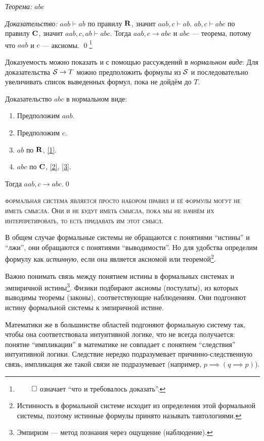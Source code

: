 {\it Теорема:} $abc$

{\it Доказательство:}
$aab\vdash ab$ по правилу $\mathbf{R}$, значит $aab,c\vdash ab$.
$ab,c\vdash abc$ по правилу $\mathbf{C}$, значит $aab,c,ab\vdash abc$.
Тогда $aab,c\to abc$ и $abc$ --- теорема, потому что $aab$ и $c$ --- аксиомы.
\qed\footnote{$\qed$ означает ``что и требовалось доказать''.}

Доказуемость можно показать и с помощью рассуждений в {\it нормальном виде}:
Для доказательства $\mathcal S\to T$ можно предположить формулы из $\mathcal S$ и последовательно
увеличивать список выведенных формул, пока не дойдём до $T$.

\pagebreak

Доказательство $abc$ в нормальном виде:
\begin{enumerate}[label=(\arabic*)]
	\item{}\label{1}Предположим $aab$.
	\item{}\label{2}Предположим $c$.
	\item{}\label{3}$ab$ по $\mathbf{R}$, \ref{1}.
	\item{}\label{4}$abc$ по $\mathbf{C}$, \ref{2}, \ref{3}.
\end{enumerate}

Тогда $aab,c\to abc$.\qed

\textsc{формальная система является просто набором правил и её формулы
	могут не иметь смысла. Они и не будут иметь смысла, пока мы не начнём их
	интерпретировать, то есть придавать им этот смысл.}

В общем случае формальные системы не обращаются с понятиями ``истины'' и ``лжи'',
они обращаются с понятиями ``выводимости''. Но для удобства определим формулу
как {\it истинную}, если она является аксиомой или теоремой\footnote{
	Истинность в формальной системе исходит из
	определения этой формальной системы,
	поэтому истинные формулы принято называть тавтологиями.
}.

Важно понимать связь между понятием истины в формальных системах
и эмпиричной истины\footnote{Эмпиризм --- метод познания через ощущение (наблюдение).}.
Физики подбирают аксиомы (постулаты),
из которых выводимы теоремы (законы), соответствующие наблюдениям.
Они подгоняют истину формальной системы к эмпиричной истине.

Математики же
в большинстве областей подгоняют формальную систему так,
чтобы она соответствовала интуитивной логике,
что не всегда получается: понятие ``импликации'' в математике не совпадает
с понятием ``следствия'' интуитивной логики. Следствие
нередко подразумевает причинно-следственную
связь, импликация же такой связи не подразумевает (например, ${p\implies(q\implies p)}$).

